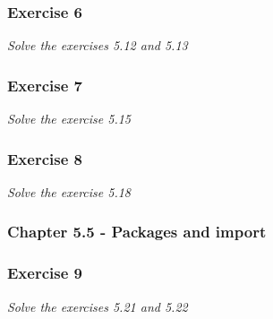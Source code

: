 \subsubsection*{Exercise 6}
\textit{Solve the exercises 5.12 and 5.13}

\subsubsection*{Exercise 7}
\textit{Solve the exercise 5.15}

\subsubsection*{Exercise 8}
\textit{Solve the exercise 5.18}

\subsubsection{Chapter 5.5 - Packages and import}

\subsubsection*{Exercise 9}
\textit{Solve the exercises 5.21 and 5.22}
